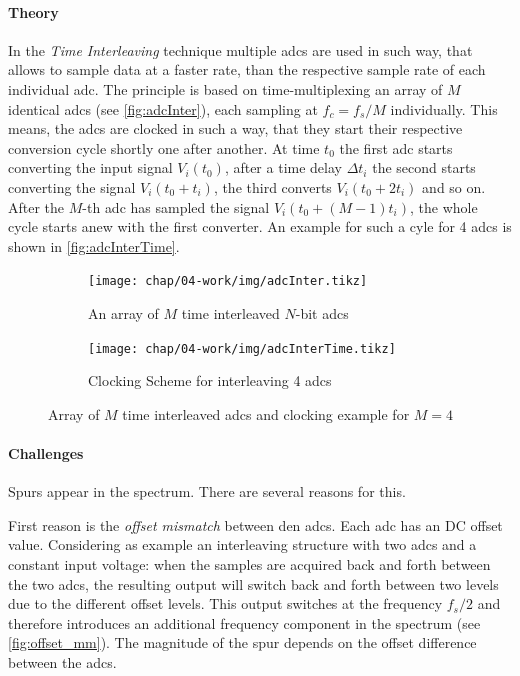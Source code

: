 \paragraph{Theory}
In the \textit{Time Interleaving} technique multiple \glspl{adc} are used in such way, that allows to sample data at a faster rate, than the respective sample rate of each individual \gls{adc}. 
The principle is based on time-multiplexing an array of $M$ identical \glspl{adc} (see \autoref{fig:adcInter}), each sampling at $f_c = f_s/M$ individually. This means, the \glspl{adc} are clocked in such a way, that they start their respective conversion cycle shortly one after another. 
At time $t_0$ the first \gls{adc} starts converting the input signal $V_i(t_0)$, after a time delay $\Delta t_i$ the second starts converting the signal $V_i(t_0 + t_i)$, the third converts $V_i(t_0 + 2t_i)$ and so on. 
After the $M$-th \gls{adc} has sampled the signal $V_i(t_0 + (M-1)t_i)$, the whole cycle starts anew with the first converter. \cite{mangrob}
An example for such a cyle for 4 \glspl{adc} is shown in \autoref{fig:adcInterTime}.

\begin{figure}[tbh]
	\centering
	\begin{subfigure}{\textwidth}
		\centering
		\texttt{[image: chap/04-work/img/adcInter.tikz]}  
		\caption{An array of $M$ time interleaved $N$-bit \glspl{adc} \cite{mangrob}}
		\label{fig:adcInter}
	\end{subfigure}
	\vspace*{1ex}
	\begin{subfigure}{\textwidth}
		\centering
		\tikzexternaldisable
		\texttt{[image: chap/04-work/img/adcInterTime.tikz]}  
		\caption{Clocking Scheme for interleaving 4 \glspl{adc}}
		\tikzexternalenable
		\label{fig:adcInterTime}
	\end{subfigure}
	\caption[Time-Interleaving Method]{Array of $M$ time interleaved \glspl{adc} and clocking example for $M = 4$}
	\label{fig:interleaving}
\end{figure}


\paragraph{Challenges}
Spurs appear in the spectrum. There are several reasons for this.

First reason is the \textit{offset mismatch} between den \glspl{adc}. 
Each \gls{adc} has an DC offset value. Considering as example an interleaving structure with two \glspl{adc} and a constant input voltage: when the samples are acquired back and forth between the two \glspl{adc}, the resulting output will switch back and forth between two levels due to the different offset levels. 
This output switches at the frequency $f_s/2$ and therefore introduces an additional frequency component in the spectrum (see \autoref{fig:offset_mm}). 
The magnitude of the spur depends on the offset difference between the \glspl{adc}. \cite{Harris2019}

